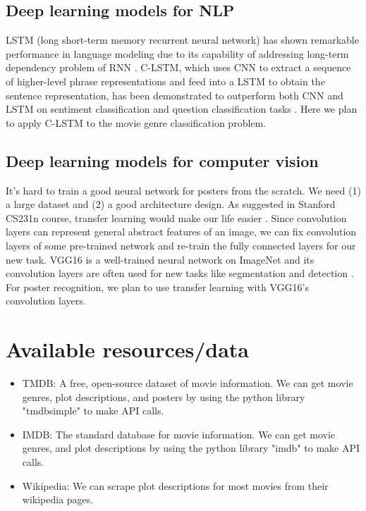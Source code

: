 \documentclass[12pt]{article}
\begin{document}
\subsection*{Deep learning models for NLP}
LSTM (long short-term memory recurrent neural network) has shown remarkable performance in language modeling due to its capability of addressing long-term dependency problem of RNN \cite{LSTM}. C-LSTM, which uses CNN to extract a sequence of higher-level phrase representations and feed into a LSTM to obtain the sentence representation, has been demonstrated to outperform both CNN and LSTM on sentiment classification and question classification tasks \cite{C-LSTM}. Here we plan to apply C-LSTM to the movie genre classification problem.

\subsection*{Deep learning models for computer vision}
It's hard to train a good neural network for posters from the scratch. We need (1) a large dataset and (2) a good architecture design. As suggested in Stanford CS231n course, transfer learning would make our life easier \cite{cs231n}. Since convolution layers can represent general abstract features of an image, we can fix convolution layers of some pre-trained network and re-train the fully connected layers for our new task. VGG16 is a well-trained neural network on ImageNet and its convolution layers are often used for new tasks like segmentation and detection \cite{VGG16}. For poster recognition, we plan to use transfer learning with VGG16's convolution layers.

\section*{Available resources/data}
\begin{itemize}
  \item TMDB: A free, open-source dataset of movie information. We can get movie genres, plot descriptions, and posters by using the python library "tmdbsimple" to make API calls.
  \item IMDB: The standard database for movie information. We can get movie genres, and plot descriptions by using the python library "imdb" to make API calls.
  \item Wikipedia: We can scrape plot descriptions for most movies from their wikipedia pages.
\end{itemize}
\end{document}
